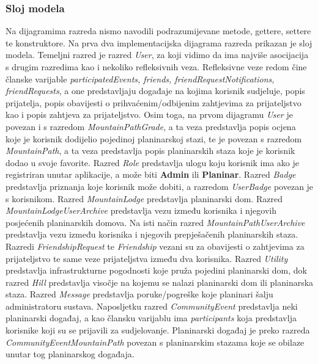 			\subsubsection{Sloj modela}
			Na dijagramima razreda nismo navodili podrazumijevane metode, gettere, settere te konstruktore.
			Na prva dva implementacijska dijagrama razreda prikazan je sloj modela. Temeljni razred je razred \textit{User}, za koji vidimo da ima najviše asocijacija s drugim razredima kao i nekoliko refleksivnih veza. Refleksivne veze redom čine članske varijable \textit{participatedEvents, friends, friendRequestNotifications, friendRequests}, a one predstavljaju događaje na kojima korisnik sudjeluje, popis prijatelja, popis obavijesti o prihvaćenim/odbijenim zahtjevima za prijateljstvo kao i popis zahtjeva za prijateljstvo. Osim toga, na prvom dijagramu \textit{User} je povezan i s razredom \textit{MountainPathGrade}, a ta veza predstavlja popis ocjena koje je korisnik dodijelio pojedinoj planinarskoj stazi, te je povezan s razredom \textit{MountainPath}, a ta veza predstavlja popis planinarskih staza koje je korisnik dodao u svoje favorite. Razred \textit{Role} predstavlja ulogu koju korisnik ima ako je registriran unutar aplikacije, a može biti \textbf{Admin} ili \textbf{Planinar}. Razred \textit{Badge} predstavlja priznanja koje korisnik može dobiti, a razredom \textit{UserBadge} povezan je s korisnikom. Razred \textit{MountainLodge} predstavlja planinarski dom. Razred \textit{MountainLodgeUserArchive} predstavlja vezu između korisnika i njegovih posjećenih planinarskih domova. Na isti način razred \textit{MountainPathUserArchive} predstavlja vezu između korisnika i njegovih prepješačenih planinarskih staza. Razredi \textit{FriendshipRequest} te \textit{Friendship} vezani su za obavijesti o zahtjevima za prijateljstvo te same veze prijateljstva između dva korisnika. Razred \textit{Utility} predstavlja infrastrukturne pogodnosti koje pruža pojedini planinarski dom, dok razred \textit{Hill} predstavlja visočje na kojemu se nalazi planinarski dom ili planinarska staza. Razred \textit{Message} predstavlja poruke/pogreške koje planinari šalju administratoru sustava. Naposljetku razred \textit{CommunityEvent} predstavlja neki planinarski događaj, a kao člansku varijablu ima \textit{participants} koja predstavlja korisnike koji su se prijavili za sudjelovanje. Planinarski događaj je preko razreda \textit{CommunityEventMountainPath} povezan s planinarskim stazama koje se obilaze unutar tog planinarskog događaja.
			
